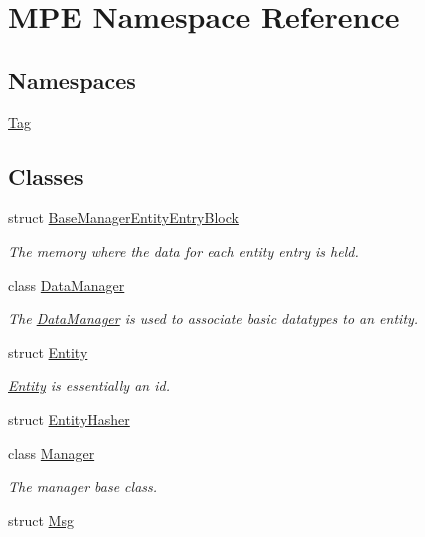 \hypertarget{namespace_m_p_e}{}\section{M\+PE Namespace Reference}
\label{namespace_m_p_e}
\subsection*{Namespaces}
\begin{DoxyCompactItemize}
\item 
 \hyperlink{namespace_m_p_e_1_1_tag}{Tag}
\end{DoxyCompactItemize}
\subsection*{Classes}
\begin{DoxyCompactItemize}
\item 
struct \hyperlink{struct_m_p_e_1_1_base_manager_entity_entry_block}{Base\+Manager\+Entity\+Entry\+Block}
\begin{DoxyCompactList}\small\item\em The memory where the data for each entity entry is held. \end{DoxyCompactList}\item 
class \hyperlink{class_m_p_e_1_1_data_manager}{Data\+Manager}
\begin{DoxyCompactList}\small\item\em The \hyperlink{class_m_p_e_1_1_data_manager}{Data\+Manager} is used to associate basic datatypes to an entity. \end{DoxyCompactList}\item 
struct \hyperlink{struct_m_p_e_1_1_entity}{Entity}
\begin{DoxyCompactList}\small\item\em \hyperlink{struct_m_p_e_1_1_entity}{Entity} is essentially an id. \end{DoxyCompactList}\item 
struct \hyperlink{struct_m_p_e_1_1_entity_hasher}{Entity\+Hasher}
\item 
class \hyperlink{class_m_p_e_1_1_manager}{Manager}
\begin{DoxyCompactList}\small\item\em The manager base class. \end{DoxyCompactList}\item 
struct \hyperlink{struct_m_p_e_1_1_msg}{Msg}
\item 

\end{DoxyCompactItemize}
